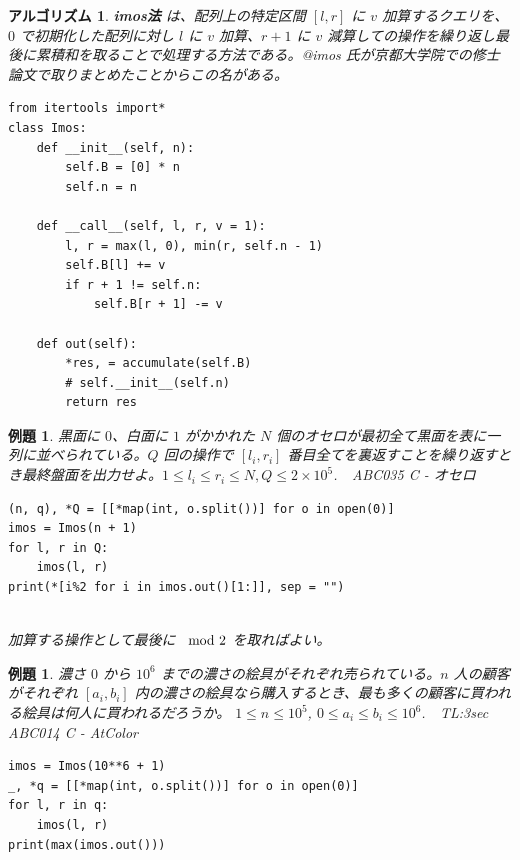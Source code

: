 \documentclass[12pt, a4j]{ltjsarticle}
\newtheorem{alg}[thm]{アルゴリズム}
\newtheorem{exm}[thm]{例題}
\begin{document}
\vspace{1cm}

\begin{alg} {\bf imos法} は、配列上の特定区間 $[l, r]$ に $v$ 加算するクエリを、 $0$ で初期化した配列に対し $l$ に $v$ 加算、$r + 1$ に $v$ 減算しての操作を繰り返し最後に累積和を取ることで処理する方法である。@imos 氏が京都大学院での修士論文で取りまとめたことからこの名がある。\\\upshape
\begin{lstlisting}
from itertools import*
class Imos:
    def __init__(self, n):
        self.B = [0] * n
        self.n = n

    def __call__(self, l, r, v = 1):
        l, r = max(l, 0), min(r, self.n - 1)
        self.B[l] += v
        if r + 1 != self.n:
            self.B[r + 1] -= v

    def out(self):
        *res, = accumulate(self.B)
        # self.__init__(self.n)
        return res
\end{lstlisting}
\end{alg}
\vspace{1.5cm}
\newpage
\begin{exm} 黒面に $0$、白面に $1$ がかかれた $N$ 個のオセロが最初全て黒面を表に一列に並べられている。$Q$ 回の操作で $[l_i,r_i]$ 番目全てを裏返すことを繰り返すとき最終盤面を出力せよ。$1\le l_i\le r_i \le N,Q\le 2\times10^5$.\ \upshape\ ABC035 C - オセロ\\
\begin{lstlisting}
(n, q), *Q = [[*map(int, o.split())] for o in open(0)]
imos = Imos(n + 1)
for l, r in Q:
    imos(l, r)
print(*[i%2 for i in imos.out()[1:]], sep = "")
\end{lstlisting}\quad\\
加算する操作として最後に $\hspace{-0.6mm}\mod 2$ を取ればよい。
\end{exm}

\vspace{3cm}

\begin{exm}
濃さ $0$ から $10^6$ までの濃さの絵具がそれぞれ売られている。$n$ 人の顧客がそれぞれ $[a_i,b_i]$ 内の濃さの絵具なら購入するとき、最も多くの顧客に買われる絵具は何人に買われるだろうか。 $1\le n \le 10^5$, $0\le a_i\le b_i\le 10^6$.\ \ \upshape TL:3sec　ABC014 C - AtColor\\
\begin{lstlisting}
imos = Imos(10**6 + 1)
_, *q = [[*map(int, o.split())] for o in open(0)]
for l, r in q:
    imos(l, r)
print(max(imos.out()))
\end{lstlisting}
\end{exm}
\end{document}
